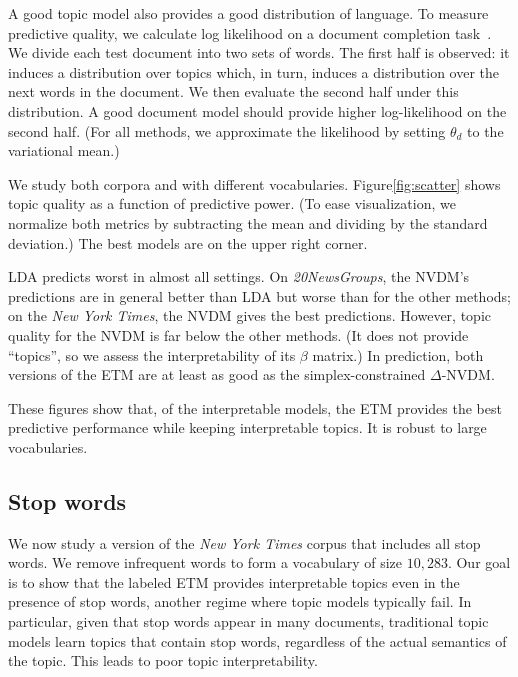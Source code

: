 \documentclass[11pt,a4paper]{article}
\begin{document}
A good topic model also provides a good distribution of language.  To
measure predictive quality, we calculate log likelihood on a document
completion task~\citep{rosenzvi2004author,wallach2009evaluation}. We
divide each test document into two sets of words.  The first half is
observed: it induces a distribution over topics which, in turn,
induces a distribution over the next words in the document.  We then
evaluate the second half under this distribution. A good document
model should provide higher log-likelihood on the second half. (For
all methods, we approximate the likelihood by setting $\theta_d$ to
the variational mean.)

We study both corpora and with different
vocabularies. Figure\nobreakspace \ref {fig:scatter} shows topic quality as a function of
predictive power. (To ease visualization, we normalize both metrics by
subtracting the mean and dividing by the standard deviation.) The best
models are on the upper right corner.

\gls{LDA} predicts worst in almost all settings. On
\emph{20NewsGroups}, the \gls{NVDM}'s predictions are in general
better than \gls{LDA} but worse than for the other methods; on the
\emph{New York Times}, the \gls{NVDM} gives the best
predictions. However, topic quality for the \gls{NVDM} is far below
the other methods.  (It does not provide ``topics'', so we assess the
interpretability of its $\beta$ matrix.)  In prediction, both versions
of the \gls{ETM} are at least as good as the simplex-constrained
$\Delta$-\gls{NVDM}.

These figures show that, of the interpretable models, the \gls{ETM}
provides the best predictive performance while keeping interpretable
topics.  It is robust to large vocabularies.

\subsection{Stop words}
\label{subsec:experiments_stopwords}

We now study a version of the \emph{New York Times} corpus that
includes all stop words. We remove infrequent words to form a vocabulary
of size $10{,}283$.  Our goal is to show that the labeled \gls{ETM}
provides interpretable topics even in the presence of stop words,
another regime where topic models typically fail. In particular, given that
stop words appear in many documents, traditional topic models learn topics
that contain stop words, regardless of the actual semantics of the topic.
This leads to poor topic interpretability.
\end{document}
